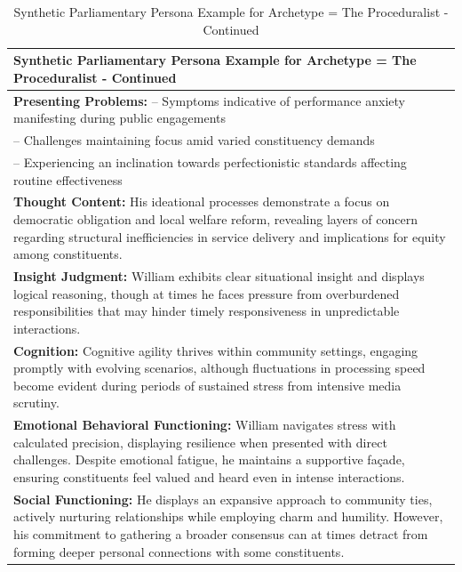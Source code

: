 \documentclass[11pt]{article}
\begin{document}
\begin{table}[ht]
\centering
\caption{Synthetic Parliamentary Persona Example for Archetype = The Proceduralist - Continued}
\label{tab:parliamentry-persona-example-2}
\scriptsize %
\begin{tabularx}{\textwidth}{X}
\toprule
\textbf{Synthetic Parliamentary Persona Example for Archetype = The Proceduralist - Continued} \\
\midrule
\textbf{Presenting Problems:}
– Symptoms indicative of performance anxiety manifesting during public engagements \\
– Challenges maintaining focus amid varied constituency demands \\
– Experiencing an inclination towards perfectionistic standards affecting routine effectiveness \\[4pt]

\textbf{Thought Content:} His ideational processes demonstrate a focus on democratic obligation and local welfare reform, revealing layers of concern regarding structural inefficiencies in service delivery and implications for equity among constituents. \\[4pt]

\textbf{Insight Judgment:} William exhibits clear situational insight and displays logical reasoning, though at times he faces pressure from overburdened responsibilities that may hinder timely responsiveness in unpredictable interactions. \\[4pt]

\textbf{Cognition:} Cognitive agility thrives within community settings, engaging promptly with evolving scenarios, although fluctuations in processing speed become evident during periods of sustained stress from intensive media scrutiny. \\[4pt]

\textbf{Emotional Behavioral Functioning:} William navigates stress with calculated precision, displaying resilience when presented with direct challenges. Despite emotional fatigue, he maintains a supportive façade, ensuring constituents feel valued and heard even in intense interactions. \\[4pt]

\textbf{Social Functioning:} He displays an expansive approach to community ties, actively nurturing relationships while employing charm and humility. However, his commitment to gathering a broader consensus can at times detract from forming deeper personal connections with some constituents. \\[4pt]


\end{tabularx}
\end{table}
\end{document}
